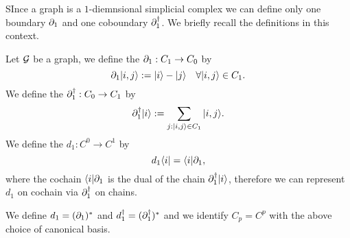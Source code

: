 \documentclass[../2.tex]{subfiles}
\begin{document}
    
    SInce a graph is a $1$-diemnsional simplicial complex we can define only one boundary $\partial_1$ and one coboundary $\partial_1^\dagger$.
    We briefly recall the definitions in this context.

    \begin{defn}
        Let $\mathcal{G}$ be a graph, we define the  $\partial_1 : C_1 \to C_0$ by 
        \[ \partial_1| i,j \rangle := | i \rangle - | j \rangle \quad \forall | i,j \rangle \in C_1.\]
        We define the  $\partial^\dagger_1 : C_0 \to C_1$ by 
        \[ \partial^\dagger_1| i \rangle := \sum_{j : | i,j \rangle \in C_1} | i,j \rangle.\]
        We define the  $d_1 : C^0 \to C^1$ by
        \[ d_1\langle i | = \langle i |\partial_1,\]
        where the cochain $\langle i |\partial_1$ is the dual of the chain $\partial_1^\dagger| i \rangle$,
        therefore we can represent $d_1$ on cochain via $\partial_1^\dagger$ on chains.
    \end{defn}

    We define $d_1 = (\partial_1)^*$ and $d_1^\dagger = (\partial_1^\dagger)^*$ and we identify $C_p = C^p$ with the above choice of
    canonical basis.





\end{document}
